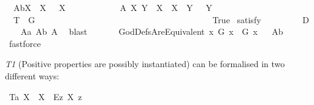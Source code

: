 \begin{isabellebody}
\isanewline
\ \ A{}b{\isacharcolon}{\isachardoublequoteopen}{\isasymlfloor}\isactrlbold {\isasymforall}X{\isachardot}\ \isactrlbold {\isasymnot}{\isacharparenleft}{\isasymP}\ X{\isacharparenright}\ \isactrlbold {\isasymrightarrow}\ {\isasymP}\ {\isacharparenleft}{\isasymrightharpoondown}X{\isacharparenright}{\isasymrfloor}{\isachardoublequoteclose}\ \ \ \ \ \ \ \ \ \ %
\isanewline
\ \ A{}{\isacharcolon}\ {\isachardoublequoteopen}{\isasymlfloor}\isactrlbold {\isasymforall}X\ Y{\isachardot}\ {\isacharparenleft}{\isasymP}\ X\ \isactrlbold {\isasymand}\ {\isacharparenleft}X\ {\isasymRrightarrow}\ Y{\isacharparenright}{\isacharparenright}\ \isactrlbold {\isasymrightarrow}\ {\isasymP}\ Y{\isasymrfloor}{\isachardoublequoteclose}\ \ \ %
\isanewline
\ \ T{}{\isacharcolon}\ {\isachardoublequoteopen}{\isasymlfloor}{\isasymP}\ {\isasymdown}G{\isasymrfloor}{\isachardoublequoteclose}\ \ \ \ \ \ \ \ \ \ \ \ \ \ \ \ \ \ \ \ \ \ \ \ \ \ \ \ \ \ \ %
\isanewline
\ \ \ \ \ \ \ \ \isanewline
{}\isamarkupfalse%
\ True\ \isamarkupfalse%
{\isacharbrackleft}satisfy{\isacharbrackright}%
\ %
%
\isamarkupfalse%
\ %
%
%
%
\isanewline
\ \ \ \ \isanewline
{}\isamarkupfalse%
\ {\isachardoublequoteopen}{\isasymlfloor}D{\isasymrfloor}{\isachardoublequoteclose}%
\ \ %
%
\isamarkupfalse%
\ A{}a\ A{}b\ A{}\ \isamarkupfalse%
\ blast\ %
%
%
%
\isanewline
\ \ \ \ \isanewline
{}\isamarkupfalse%
\ GodDefsAreEquivalent{\isacharcolon}\ {\isachardoublequoteopen}{\isasymlfloor}\isactrlbold {\isasymforall}x{\isachardot}\ G\ x\ \isactrlbold {\isasymleftrightarrow}\ G{\isacharasterisk}\ x{\isasymrfloor}{\isachardoublequoteclose}%
\ %
%
\isamarkupfalse%
\ A{}b\ \isamarkupfalse%
\ fastforce%
%
%
%
\begin{isamarkuptext}%
\emph{T1} (Positive properties are possibly instantiated) can be formalised in two different ways:%
\end{isamarkuptext}\isamarkuptrue%
\isamarkupfalse%
\ T{}a{\isacharcolon}\ {\isachardoublequoteopen}{\isasymlfloor}\isactrlbold {\isasymforall}X{\isacharcolon}{\isacharcolon}{\isasymlangle}{\isasymzero}{\isasymrangle}{\isachardot}\ {\isasymP}\ X\ \isactrlbold {\isasymrightarrow}\ \isactrlbold {\isasymdiamond}{\isacharparenleft}\isactrlbold {\isasymexists}\isactrlsup Ez{\isachardot}\ {\isasymlparr}X\ z{\isasymrparr}{\isacharparenright}{\isasymrfloor}{\isachardoublequoteclose}\ \isanewline

\end{isabellebody}
